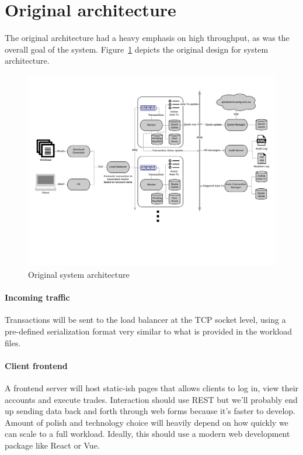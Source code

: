 \section{Original architecture}
The original architecture had a heavy emphasis on high throughput, as was the overall goal of the system.
Figure~\ref{fig:arch-orig} depicts the original design for system architecture.

\begin{figure}[tbph]
  \centering
  \includegraphics[width=0.85\linewidth]{../architecture/graphics/arch}
  \caption{Original system architecture}
  \label{fig:arch-orig}
\end{figure}


\paragraph{Incoming traffic}
Transactions will be sent to the load balancer at the TCP socket level, using a pre-defined serialization format very similar to what is provided in the workload files.

\paragraph{Client frontend}
A frontend server will host static-ish pages that allows clients to log in, view their accounts and execute trades.
Interaction should use REST but we'll probably end up sending data back and forth through web forms because it's faster to develop.
Amount of polish and technology choice will heavily depend on how quickly we can scale to a full workload.
Ideally, this should use a modern web development package like React or Vue.

